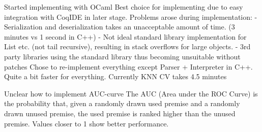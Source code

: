 Started implementing with OCaml
	Best choice for implementing due to easy integration with CoqIDE in later stage.
	Problems arose during implementation:
		- Serialization and deserialization takes an unacceptable amount of time. (3 minutes vs 1 second in C++)
		- Not ideal standard library implementation for List etc. (not tail recursive), resulting in stack overflows for large objects.
		- 3rd party libraries using the standard library thus becoming unsuitable without patches
Chose to re-implement everything except Parser + Interpreter in C++.
	Quite a bit faster for everything.
	Currently KNN CV takes 4.5 minutes

Unclear how to implement AUC-curve
	The AUC (Area under the ROC Curve) is the probability that, given a randomly drawn
	used premise and a randomly drawn unused premise, the used premise is ranked higher than
	the unused premise. Values closer to 1 show better performance.


